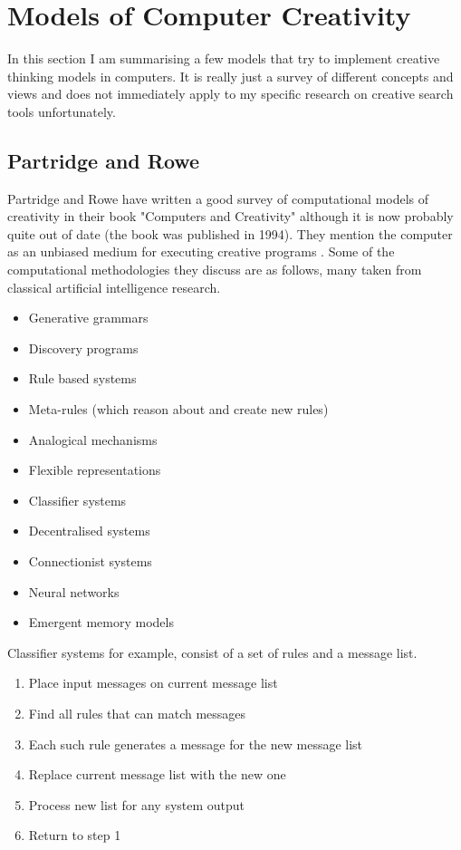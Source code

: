 \section{Models of Computer Creativity}

In this section I am summarising a few models that try to implement creative thinking models in computers. It is really just a survey of different concepts and views and does not immediately apply to my specific research on creative search tools unfortunately.

\subsection{Partridge and Rowe}

Partridge and Rowe have written a good survey of computational models of creativity in their book "Computers and Creativity" \citep{Partridge1994} although it is now probably quite out of date (the book was published in 1994). They mention the computer as an unbiased medium for executing creative programs \citep[p.26]{Partridge1994}. Some of the computational methodologies they discuss are as follows, many taken from classical artificial intelligence research.

\begin{itemize}
  \item Generative  grammars
  \item Discovery programs
  \item Rule based systems
  \item Meta-rules (which reason about and create new rules)
  \item Analogical mechanisms
  \item Flexible representations
  \item Classifier systems
  \item Decentralised systems
  \item Connectionist systems
  \item Neural networks
  \item Emergent memory models
\end{itemize}

Classifier systems for example, consist of a set of rules and a message list.

\begin{enumerate}
  \item Place input messages on current message list
  \item Find all rules that can match messages
  \item Each such rule generates a message for the new message list
  \item Replace current message list with the new one
  \item Process new list for any system output
  \item Return to step 1
\end{enumerate}

